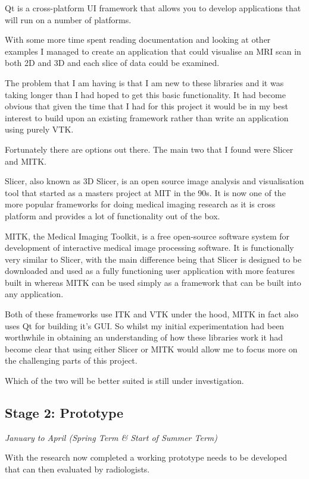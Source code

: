 \documentclass[
  oneside,
  11pt, a4paper,
  footinclude=true,
  headinclude=true,
  cleardoublepage=empty
]{scrbook}
\begin{document}
Qt is a cross-platform UI framework that allows you to develop applications that will run on a number of platforms.

With some more time spent reading documentation and looking at other examples I managed to create an application that could visualise an MRI scan in both 2D and 3D and each slice of data could be examined.

The problem that I am having is that I am new to these libraries and it was taking longer than I had hoped to get this basic functionality. It had become obvious that given the time that I had for this project it would be in my best interest to build upon an existing framework rather than write an application using purely VTK.

Fortunately there are options out there. The main two that I found were Slicer and MITK.

Slicer, also known as 3D Slicer, is an open source image analysis and visualisation tool that started as a masters project at MIT in the 90s. It is now one of the more popular frameworks for doing medical imaging research as it is cross platform and provides a lot of functionality out of the box.

MITK, the Medical Imaging Toolkit, is a free open-source software system for development of interactive medical image processing software. It is functionally very similar to Slicer, with the main difference being that Slicer is designed to be downloaded and used as a fully functioning user application with more features built in whereas MITK can be used simply as a framework that can be built into any application.

Both of these frameworks use ITK and VTK under the hood, MITK in fact also uses Qt for building it’s GUI. So whilst my initial experimentation had been worthwhile in obtaining an understanding of how these libraries work it had become clear that using either Slicer or MITK would allow me to focus more on the challenging parts of this project.

Which of the two will be better suited is still under investigation.

\newpage
\subsection*{Stage 2: Prototype}
\textit{January to April (Spring Term \& Start of Summer Term)}

With the research now completed a working prototype needs to be developed that can then evaluated by radiologists.
\end{document}
